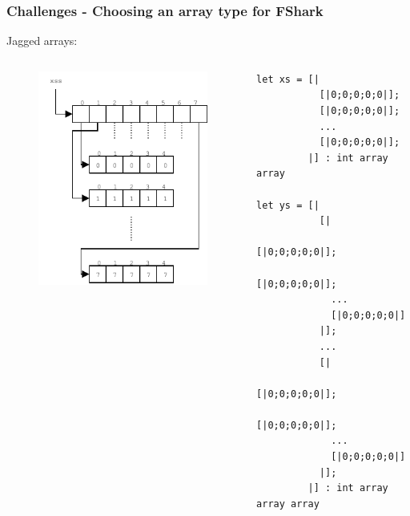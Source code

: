 \documentclass[10pt, compress, usenames, dvipsnames]{beamer}
\begin{document}
\begin{frame}[fragile]
  \frametitle{Challenges - Choosing an array type for FShark}
  Jagged arrays:\\
  \begin{columns}
    \begin{column}{.48\textwidth}
  \begin{figure}
    \centering
    \includegraphics[scale=1]{./images/jaggedarrays}
  \end{figure}
    \end{column}
    \begin{column}{.48\textwidth}
\begin{verbatim}
let xs = [|
           [|0;0;0;0;0|];
           [|0;0;0;0;0|];
           ...
           [|0;0;0;0;0|];
         |] : int array array 

let ys = [|
           [|
             [|0;0;0;0;0|];
             [|0;0;0;0;0|];
             ...
             [|0;0;0;0;0|]
           |];
           ...
           [|
             [|0;0;0;0;0|];
             [|0;0;0;0;0|];
             ...
             [|0;0;0;0;0|]
           |];
         |] : int array array array
    \end{verbatim}
    \end{column}
  \end{columns}
\end{frame}
\end{document}

